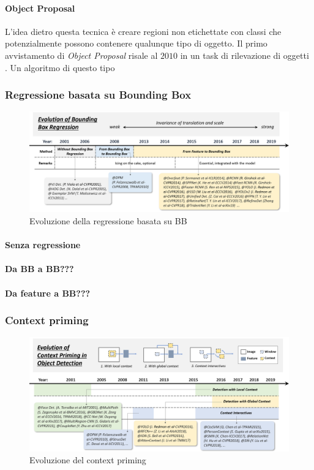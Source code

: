 \paragraph{Object Proposal}
L'idea dietro questa tecnica è creare regioni non etichettate con classi che potenzialmente possono contenere qualunque tipo di oggetto. 
Il primo avvistamento di \textit{Object Proposal} risale al $2010$ in un task di rilevazione di oggetti \cite{alexe2010object}. 
Un algoritmo di questo tipo 
\subsubsection{Regressione basata su Bounding Box}
\begin{figure}
    \centering
    \includegraphics[width=\textwidth]{images/evol-bbreg.png}
    \caption{Evoluzione della regressione basata su \ac{BB} \cite{DBLP:journals/corr/abs-1905-05055}}
    \label{fig:bbox_history}
\end{figure}
\paragraph{Senza regressione}
\paragraph{Da BB a BB???}
\paragraph{Da feature a BB???}
\subsubsection{Context priming}
\begin{figure}
    \centering
    \includegraphics[width=\textwidth]{images/evol-context.png}
    \caption{Evoluzione del context priming \cite{DBLP:journals/corr/abs-1905-05055}}
    \label{fig:context_history}
\end{figure}
